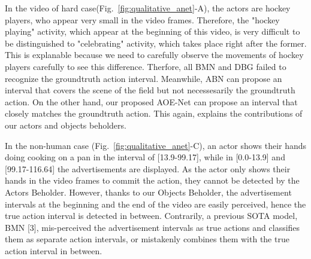 \documentclass[sn-mathphys]{sn-jnl}
\theoremstyle{thmstyleone}\newtheorem{theorem}{Theorem}\newtheorem{proposition}[theorem]{Proposition}
\theoremstyle{thmstyletwo}\newtheorem{example}{Example}\newtheorem{remark}{Remark}
\theoremstyle{thmstylethree}\newtheorem{definition}{Definition}
\begin{document}
In the video of hard case(Fig.~\ref{fig:qualitative_anet}-A), the actors are hockey players, who appear very small in the video frames. Therefore, the "hockey playing" activity, which appear at the beginning of this video, is very difficult to be distinguished to "celebrating" activity, which takes place right after the former. This is explanable because we need to carefully observe the movements of hockey players carefully to see this difference. Therfore, all BMN and DBG failed to recognize the groundtruth action interval. Meanwhile, ABN can propose an interval that covers the scene of the field but not necessesarily the groundtruth action. On the other hand, our proposed AOE-Net can propose an interval that closely matches the groundtruth action. This again, explains the contributions of our actors and objects beholders.

In the non-human case (Fig.~\ref{fig:qualitative_anet}-C), an actor shows their hands doing cooking on a pan in the interval of [13.9-99.17], while in [0.0-13.9] and [99.17-116.64] the advertisements are displayed. As the actor only shows their hands in the video frames to commit the action, they cannot be detected by the Actors Beholder. However, thanks to our Objects Beholder, the advertisement intervals at the beginning and the end of the video are easily perceived, hence the true action interval is detected in between. Contrarily, a previous SOTA model, BMN [3], mis-perceived the advertisement intervals as true actions and classifies them as separate action intervals, or mistakenly combines them with the true action interval in between.





\vspace{-1mm}
\end{document}
